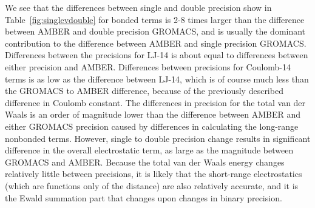 We see that the differences between single and double precision show
in Table~\ref{fig:singlevdouble} for bonded terms is 2-8 times larger
than the difference between AMBER and double precision GROMACS, and is
usually the dominant contribution to the difference between AMBER and
single precision GROMACS.  Differences between the precisions for
LJ-14 is about equal to differences between either precision and
AMBER.  Differences between precisions for Coulomb-14 terms is as low
as the difference between LJ-14, which is of course much less than the
GROMACS to AMBER difference, because of the previously described
difference in Coulomb constant. The differences in precision for the
total van der Waals is an order of magnitude lower than the difference
between AMBER and either GROMACS precision caused by differences in
calculating the long-range nonbonded terms.  However, single to double
precision change results in significant difference in the overall
electrostatic term, as large as the magnitude between GROMACS and
AMBER.  Because the total van der Waals energy changes relatively
little between precisions, it is likely that the short-range
electrostatics (which are functions only of the distance) are also
relatively accurate, and it is the Ewald summation part that changes
upon changes in binary precision.


